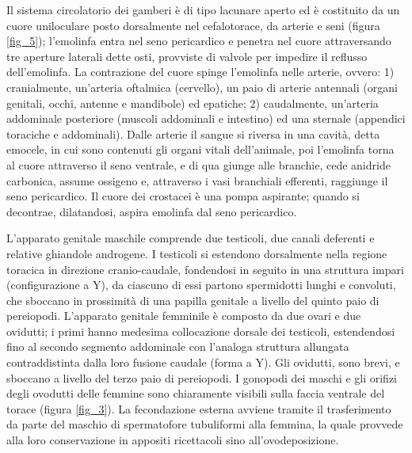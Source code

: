 \documentclass[11pt,a4paper,italian,twoside,openany]{memoir}
\begin{document}
Il sistema circolatorio dei gamberi è di tipo lacunare aperto ed è costituito da un cuore uniloculare posto dorsalmente nel cefalotorace, da arterie e seni (figura \ref{fig_5}); l'emolinfa entra nel seno pericardico e penetra nel cuore attraversando tre aperture laterali dette osti, provviste di valvole per impedire il reflusso dell'emolinfa. La contrazione del cuore spinge l'emolinfa nelle arterie, ovvero: 1) cranialmente, un'arteria oftalmica (cervello), un paio di arterie antennali (organi genitali, occhi, antenne e mandibole) ed epatiche; 2) caudalmente, un'arteria addominale posteriore (muscoli addominali e intestino) ed una sternale (appendici toraciche e addominali). Dalle arterie il sangue si riversa in una cavità, detta emocele, in cui sono contenuti gli organi vitali dell'animale, poi l'emolinfa torna al cuore attraverso il seno ventrale, e di qua giunge alle branchie, cede anidride carbonica, assume ossigeno e, attraverso i vasi branchiali efferenti, raggiunge il seno pericardico. Il cuore dei crostacei è una pompa aspirante; quando si decontrae, dilatandosi, aspira emolinfa dal seno pericardico.

L'apparato genitale maschile comprende due testicoli, due canali deferenti e relative ghiandole androgene. I testicoli si estendono dorsalmente nella regione toracica in direzione cranio-caudale, fondendosi in seguito in una struttura impari (configurazione a Y), da ciascuno di essi partono spermidotti lunghi e convoluti, che sboccano in prossimità di una papilla genitale a livello del quinto paio di pereiopodi. L'apparato genitale femminile è composto da due ovari e due ovidutti; i primi hanno medesima collocazione dorsale dei testicoli, estendendosi fino al secondo segmento addominale con l'analoga struttura allungata contraddistinta dalla loro fusione caudale (forma a Y). Gli ovidutti, sono brevi, e sboccano a livello del terzo paio di pereiopodi. I gonopodi dei maschi e gli orifizi degli ovodutti delle femmine sono chiaramente visibili sulla faccia ventrale del torace (figura \ref{fig_3}). La fecondazione esterna avviene tramite il trasferimento da parte del maschio di spermatofore tubuliformi alla femmina, la quale provvede alla loro conservazione in appositi ricettacoli sino all'ovodeposizione.
\end{document}
